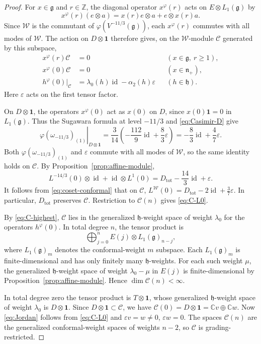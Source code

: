 \documentclass[11pt]{amsart}
\numberwithin{equation}{section}
\theoremstyle{definition}
\theoremstyle{remark}
\newcommand{\CC}{\mathbb C}
\newcommand{\ZZ}{\mathbb Z}
\newcommand{\g}{\mathfrak g}
\newcommand{\h}{\mathfrak h}
\newcommand{\nplus}{\mathfrak n_+}
\newcommand{\one}{\mathbf1}
\newcommand{\id}{\operatorname{id}}
\begin{document}
\begin{proof}
For $x\in\g$ and $r\in\ZZ$, the diagonal operator
$x^\varphi(r)$ acts on $E\otimes L_1(\g)$ by
\[
 x^\varphi(r)(e\otimes a)
 =x(r)e\otimes a+e\otimes x(r)a.
\]
Since $\mathcal W$ is the commutant of $\varphi(V^{-11/3}(\g))$,
each $x^\varphi(r)$ commutes with all modes of $\mathcal W$.
The action on $D\otimes\one$ therefore gives, on the
$\mathcal W$-module $\mathcal C$ generated by this subspace,
\begin{equation}\label{eq:C-highest}
\begin{aligned}
 x^\varphi(r)\mathcal C&=0
    &&(x\in\g,\ r\geq1),\\
 x^\varphi(0)\mathcal C&=0
    &&(x\in\nplus),\\
 h^\varphi(0)|_{\mathcal C}
    &=\lambda_0(h)\id-\alpha_2(h)\varepsilon
    &&(h\in\h).
\end{aligned}
\end{equation}
Here $\varepsilon$ acts on the first tensor factor.

On $D\otimes\one$, the operators $x^\varphi(0)$ act as
$x(0)$ on $D$, since $x(0)\one=0$ in $L_1(\g)$.
Thus the Sugawara formula at level $-11/3$ and
\eqref{eq:Casimir-D} give
\[
 \left.\varphi(\omega_{-11/3})_{(1)}\right|_{D\otimes\one}
 =\frac3{14}\left(-\frac{112}{9}\id+\frac83\varepsilon\right)
 =-\frac83\id+\frac47\varepsilon.
\]
Both $\varphi(\omega_{-11/3})_{(1)}$ and $\varepsilon$ commute
with all modes of $\mathcal W$, so the same identity holds on
$\mathcal C$. By Proposition~\ref{prop:affine-module},
\[
 L^{-14/3}(0)\otimes\id+\id\otimes L^1(0)
 =D_{\mathrm{tot}}-\frac{14}{3}\id+\varepsilon.
\]
It follows from \eqref{eq:coset-conformal} that on $\mathcal C$,
$
 L^{\mathcal W}(0)=D_{\mathrm{tot}}-2\id+\frac37\varepsilon$. 
In particular, $D_{\mathrm{tot}}$ preserves $\mathcal C$.
Restriction to $\mathcal C(n)$ gives \eqref{eq:C-L0}.

By \eqref{eq:C-highest}, $\mathcal C$ lies in the generalized
$\h$-weight space of weight $\lambda_0$ for the operators
$h^\varphi(0)$. In total degree $n$, the tensor product is
\[
 \bigoplus_{j=0}^n E(j)\otimes L_1(\g)_{n-j},
\]
where $L_1(\g)_m$ denotes the conformal-weight $m$ subspace.
Each $L_1(\g)_m$ is finite-dimensional and has only finitely
many $\h$-weights. For each such weight $\mu$, the generalized
$\h$-weight space of weight $\lambda_0-\mu$ in $E(j)$ is
finite-dimensional by Proposition~\ref{prop:affine-module}.
Hence $\dim\mathcal C(n)<\infty$.

In total degree zero the tensor product is $T\otimes\one$,
whose generalized $\h$-weight space of weight $\lambda_0$ is
$D\otimes\one$. Since $D\otimes\one\subset\mathcal C$, we have
$\mathcal C(0)=D\otimes\one=\CC v\oplus\CC w$.
Now \eqref{eq:Jordan} follows from \eqref{eq:C-L0} and
$\varepsilon v=w\ne0$, $\varepsilon w=0$.
The spaces $\mathcal C(n)$ are the generalized conformal-weight
spaces of weights $n-2$, so $\mathcal C$ is grading-restricted.


\end{proof}
\end{document}
